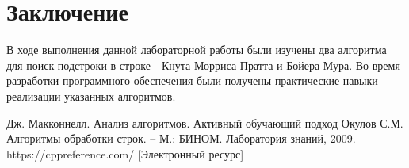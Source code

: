 \documentclass[12pt, a4paper]{report}
\begin{document}
	\chapter*{Заключение}
	В ходе выполнения данной лабораторной работы были изучены два алгоритма для поиск подстроки в строке - Кнута-Морриса-Пратта и Бойера-Мура. Во время разработки программного обеспечения были получены практические навыки реализации указанных алгоритмов.
	
	\newpage
	
	\begin{thebibliography}{}
	 Дж. Макконнелл. Анализ алгоритмов. Активный обучающий подход
	 Окулов С.М. Алгоритмы обработки строк. – М.: БИНОМ. Лаборатория знаний, 2009.
	 https://cppreference.com/ [Электронный ресурс]
	\end{thebibliography}
\end{document}
